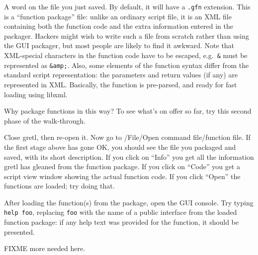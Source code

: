 \vspace{6pt}

A word on the file you just saved.  By default, it will have a
\texttt{.gfn} extension.  This is a ``function package'' file: unlike
an ordinary  script file, it is an XML file containing both
the function code and the extra information entered in the packager.
Hackers might wish to write such a file from scratch rather than using
the GUI packager, but most people are likely to find it awkward.  Note
that XML-special characters in the function code have to be escaped,
e.g.\ \texttt{\&} must be represented as \texttt{\&amp;}.  Also, some
elements of the function syntax differ from the standard script
representation: the parameters and return values (if any) are
represented in XML.  Basically, the function is pre-parsed, and ready
for fast loading using \textsf{libxml}.

\vspace{6pt}

Why package functions in this way?  To see what's on offer so far, try
this second phase of the walk-through.

Close gretl, then re-open it.  Now go to /File/Open command
file/function file.  If the first stage above has gone OK, you should
see the file you packaged and saved, with its short description.  If
you click on ``Info'' you get all the information gretl has gleaned
from the function package.  If you click on ``Code'' you get a script
view window showing the actual function code.  If you click ``Open''
the functions are loaded; try doing that.

After loading the function(s) from the package, open the GUI console.
Try typing \texttt{help foo}, replacing \texttt{foo} with the name of
a public interface from the loaded function package: if any help text
was provided for the function, it should be presented.

FIXME more needed here. 


